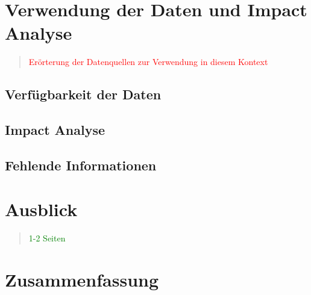 \chapter{Verwendung der Daten und Impact Analyse}

\begin{quote}
\textcolor{red}{Erörterung der Datenquellen zur Verwendung in diesem Kontext}
\end{quote}

    \section{Verfügbarkeit der Daten}
    \section{Impact Analyse}
    \section{Fehlende Informationen}

\chapter{Ausblick}
\begin{quote}
\textcolor{green}{1-2 Seiten}
\end{quote}

\chapter{Zusammenfassung}


